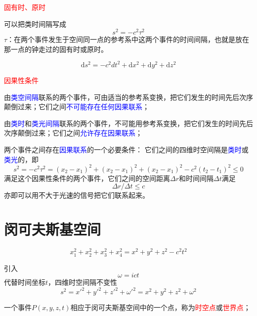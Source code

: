 \documentclass[12pt,a4paper]{article}
\newcommand{\dif}{\mathrm{d}}
\begin{document}
\textcolor{red}{固有时、原时}

可以把类时间隔写成
\begin{equation}
s^2 = -c^2 \tau^2
\end{equation}
$\tau$：在两个事件发生于空间同一点的参考系中这两个事件的时间间隔，也就是放在那一点的钟走过的固有时或原时。


\begin{equation}
\dif s^2 = -c^2 dt^2 +\dif x^2 +\dif y^2 +\dif z^2
\end{equation}

\textcolor{red}{因果性条件}

由\textcolor{blue}{类空间隔}联系的两个事件，可由适当的参考系变换，把它们发生的时间先后次序颠倒过来；它们之间\textcolor{blue}{不可能存在任何因果联系}；

由\textcolor{blue}{类时}和\textcolor{blue}{类光间隔}联系的两个事件，不可能用参考系变换，把它们发生的时间先后次序颠倒过来；它们之间\textcolor{blue}{允许存在因果联系}；

两个事件之间存在\textcolor{blue}{因果联系}的一个必要条件：
它们之间的四维时空间隔是\textcolor{blue}{类时}或\textcolor{blue}{类光}的，即
\begin{equation}
s^2 = -c^2 \tau^2 = (x_2 -x_1)^2 +(x_2 -x_1)^2 +(x_2 -x_1)^2 -c^2(t_2 -t_1)^2 \leq 0
\end{equation}
满足这个因果性条件的两个事件，它们之间的空间距离$\Delta r$和时间间隔$\Delta t$满足
\begin{equation}
\Delta r/\Delta t \leq c
\end{equation}
亦即可以用不大于光速的信号把它们联系起来。

\section{闵可夫斯基空间}
\begin{equation}
x_1^2 +x_2^2 +x_3^2 +x_4^2 = x^2 +y^2 +z^2 -c^2 t^2
\end{equation}

引入
\begin{equation}
\omega = ict
\end{equation}
代替时间坐标$t$，四维时空间隔不变性
\begin{equation}
s^2 = {x'}^2 +{y'}^2 +{z'}^2 +{\omega'}^2 = x^2 +y^2 +z^2 +\omega^2
\end{equation}

一个事件$P(x,y,z,t)$相应于闵可夫斯基空间中的一个点，称为\textcolor{red}{时空点}或\textcolor{red}{世界点}；
\end{document}
